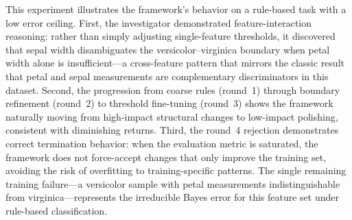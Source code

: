 This experiment illustrates the framework's behavior on a rule-based task with a low error ceiling. First, the investigator demonstrated feature-interaction reasoning: rather than simply adjusting single-feature thresholds, it discovered that sepal width disambiguates the versicolor--virginica boundary when petal width alone is insufficient---a cross-feature pattern that mirrors the classic result that petal and sepal measurements are complementary discriminators in this dataset. Second, the progression from coarse rules (round~1) through boundary refinement (round~2) to threshold fine-tuning (round~3) shows the framework naturally moving from high-impact structural changes to low-impact polishing, consistent with diminishing returns. Third, the round~4 rejection demonstrates correct termination behavior: when the evaluation metric is saturated, the framework does not force-accept changes that only improve the training set, avoiding the risk of overfitting to training-specific patterns. The single remaining training failure---a versicolor sample with petal measurements indistinguishable from virginica---represents the irreducible Bayes error for this feature set under rule-based classification.
